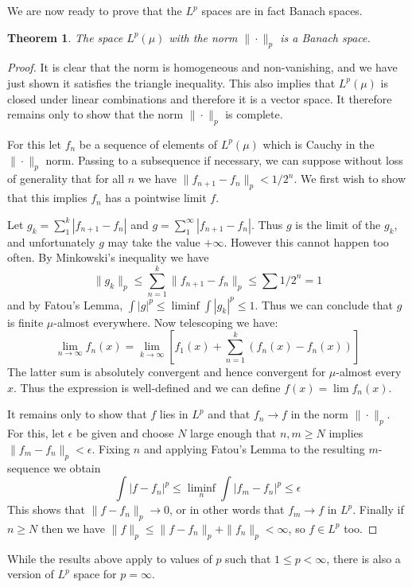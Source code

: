 \documentclass[11pt,oneside]{amsbook}
\theoremstyle{definition}
\theoremstyle{plain}
\newtheorem{thm}{Theorem}[section]
\theoremstyle{definition}
\theoremstyle{remark}
\numberwithin{equation}{section}
\numberwithin{figure}{section}
\begin{document}
We are now ready to prove that the $L^p$ spaces are in fact Banach spaces.

\begin{thm}
  The space $L^p(\mu)$ with the norm $\|\cdot\|_p$ is a Banach space.
\end{thm}

\begin{proof}
  It is clear that the norm is homogeneous and non-vanishing, and we have just shown it satisfies the triangle inequality. This also implies that $L^p(\mu)$ is closed under linear combinations and therefore it is a vector space. It therefore remains only to show that the norm $\|\cdot\|_p$ is complete.

  For this let $f_n$ be a sequence of elements of $L^p(\mu)$ which is Cauchy in the $\|\cdot\|_p$ norm. Passing to a subsequence if necessary, we can suppose without loss of generality that for all $n$ we have $\|f_{n+1}-f_n\|_p<1/2^n$. We first wish to show that this implies $f_n$ has a pointwise limit $f$.

  Let $g_k=\sum_1^k|f_{n+1}-f_n|$ and $g=\sum_1^\infty|f_{n+1}-f_n|$. Thus $g$ is the limit of the $g_k$, and unfortunately $g$ may take the value $+\infty$. However this cannot happen too often. By Minkowski's inequality we have
  \[\|g_k\|_p\leq\sum_{n=1}^k\|f_{n+1}-f_n\|_p\leq\sum1/2^n=1
  \]
  and by Fatou's Lemma, $\int|g|^p\leq\liminf\int|g_k|^p\leq1$. Thus we can conclude that $g$ is finite $\mu$-almost everywhere. Now telescoping we have:
  \[\lim_{n\to\infty} f_n(x)=\lim_{k\to\infty}\left[f_1(x)
      +\sum_{n=1}^k(f_n(x)-f_n(x))\right]
  \]
  The latter sum is absolutely convergent and hence convergent for $\mu$-almost every $x$. Thus the expression is well-defined and we can define $f(x)=\lim f_n(x)$.

  It remains only to show that $f$ lies in $L^p$ and that $f_n\to f$ in the norm $\|\cdot\|_p$. For this, let $\epsilon$ be given and choose $N$ large enough that $n,m\geq N$ implies $\|f_m-f_n\|_p<\epsilon$. Fixing $n$ and applying Fatou's Lemma to the resulting $m$-sequence we obtain
  \[\int|f-f_n|^p\leq\liminf_n\int|f_m-f_n|^p\leq\epsilon
  \]
  This shows that $\|f-f_n\|_p\to0$, or in other words that $f_m\to f$ in $L^p$. Finally if $n\geq N$ then we have $\|f\|_p\leq\|f-f_n\|_p+\|f_n\|_p<\infty$, so $f\in L^p$ too.
\end{proof}

While the results above apply to values of $p$ such that $1\leq p<\infty$, there is also a version of $L^p$ space for $p=\infty$.
\end{document}
